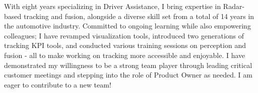 

\begin{cvparagraph}
    With eight years specializing in Driver Assistance, I bring expertise in Radar-based
    tracking and fusion, alongside a diverse skill set from a total of 14 years in the automotive industry.
    Committed to ongoing learning while also empowering colleagues; I have revamped visualization tools, introduced two generations of tracking KPI tools, and conducted various training sessions on perception and fusion - all to make working on tracking more accessible and enjoyable. I have demonstrated my willingness to be a strong team player through leading critical customer meetings and stepping into the role of Product Owner as needed. I am eager to contribute to a new team!

\end{cvparagraph}
